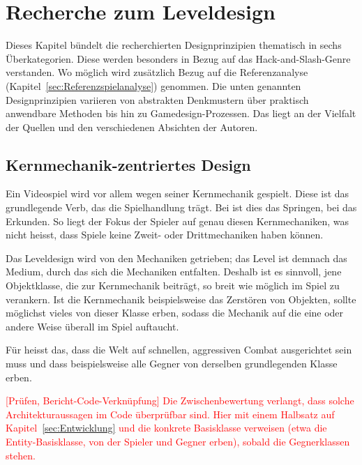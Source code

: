 \documentclass[../Main.tex]{subfiles}
\begin{document}
\section{Recherche zum Leveldesign} \label{sec:Leveldesign}
Dieses Kapitel bündelt die recherchierten Designprinzipien thematisch in sechs Überkategorien. Diese werden besonders in Bezug auf das Hack-and-Slash-Genre verstanden. Wo möglich wird zusätzlich Bezug auf die Referenzanalyse (Kapitel~\ref{sec:Referenzspielanalyse}) genommen. Die unten genannten Designprinzipien variieren von abstrakten Denkmustern über praktisch anwendbare Methoden bis hin zu Gamedesign-Prozessen. Das liegt an der Vielfalt der Quellen und den verschiedenen Absichten der Autoren.
\subsection{Kernmechanik-zentriertes Design} \label{sec:Kernmechanik}
Ein Videospiel wird vor allem wegen seiner Kernmechanik gespielt. Diese ist das grundlegende Verb, das die Spielhandlung trägt.\autocite{totten2014architectural} Bei  ist dies das Springen, bei  das Erkunden. So liegt der Fokus der Spieler auf genau diesen Kernmechaniken, was nicht heisst, dass Spiele keine Zweit- oder Drittmechaniken haben können.

Das Leveldesign wird von den Mechaniken getrieben; das Level ist demnach das Medium, durch das sich die Mechaniken entfalten.\autocite{gdc_tenprinciples2010} Deshalb ist es sinnvoll, jene Objektklasse, die zur Kernmechanik beiträgt, so breit wie möglich im Spiel zu verankern. Ist die Kernmechanik beispielsweise das Zerstören von Objekten, sollte möglichst vieles von dieser Klasse erben, sodass die Mechanik auf die eine oder andere Weise überall im Spiel auftaucht.\autocite{gdc_movingmountains2020}

Für  heisst das, dass die Welt auf schnellen, aggressiven Combat ausgerichtet sein muss und dass beispielsweise alle Gegner von derselben grundlegenden Klasse erben.

\textcolor{red}{[Prüfen, Bericht-Code-Verknüpfung] Die Zwischenbewertung verlangt, dass solche Architekturaussagen im Code überprüfbar sind. Hier mit einem Halbsatz auf Kapitel~\ref{sec:Entwicklung} und die konkrete Basisklasse verweisen (etwa die Entity-Basisklasse, von der Spieler und Gegner erben), sobald die Gegnerklassen stehen.}
\end{document}
